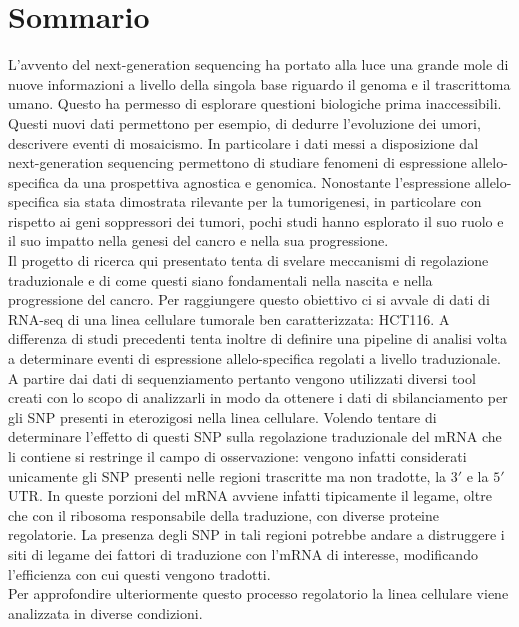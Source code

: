 \chapter*{Sommario} %
\label{sommario}

L'avvento del next-generation sequencing ha portato alla luce una grande mole di nuove informazioni a livello della singola base riguardo il genoma e il trascrittoma umano.
Questo ha permesso di esplorare questioni biologiche prima inaccessibili.
Questi nuovi dati permettono per esempio, di dedurre l'evoluzione dei umori, descrivere eventi di mosaicismo.
In particolare i dati messi a disposizione dal next-generation sequencing permettono di studiare fenomeni di espressione allelo-specifica da una prospettiva agnostica e genomica.
Nonostante l'espressione allelo-specifica sia stata dimostrata rilevante per la tumorigenesi, in particolare con rispetto ai geni soppressori dei tumori, pochi studi hanno esplorato il suo ruolo e il suo impatto nella genesi del cancro e nella sua progressione.\\[12pt]
Il progetto di ricerca qui presentato tenta di svelare meccanismi di regolazione traduzionale e di come questi siano fondamentali nella nascita e nella progressione del cancro.
Per raggiungere questo obiettivo ci si avvale di dati di RNA-seq di una linea cellulare tumorale ben caratterizzata: HCT116.
A differenza di studi precedenti tenta inoltre di definire una pipeline di analisi volta a determinare eventi di espressione allelo-specifica regolati a livello traduzionale.
A partire dai dati di sequenziamento pertanto vengono utilizzati diversi tool creati con lo scopo di analizzarli in modo da ottenere i dati di sbilanciamento per gli SNP presenti in eterozigosi nella linea cellulare.
Volendo tentare di determinare l'effetto di questi SNP sulla regolazione traduzionale del mRNA che li contiene si restringe il campo di osservazione: vengono infatti considerati unicamente gli SNP presenti nelle regioni trascritte ma non tradotte, la $3'$ e la $5'$ UTR.
In queste porzioni del mRNA avviene infatti tipicamente il legame, oltre che con il ribosoma responsabile della traduzione, con diverse proteine regolatorie.
La presenza degli SNP in tali regioni potrebbe andare a distruggere i siti di legame dei fattori di traduzione con l'mRNA di interesse, modificando l'efficienza con cui questi vengono tradotti.\\
Per approfondire ulteriormente questo processo regolatorio la linea cellulare viene analizzata in diverse condizioni.
